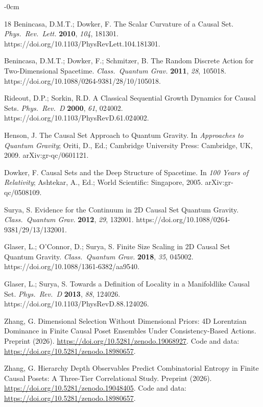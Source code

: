 \documentclass[entropy,article,submit,pdftex,moreauthors]{Definitions/mdpi}
\begin{document}
\begin{adjustwidth}{-\extralength}{0cm}
\begin{thebibliography}{18}
Benincasa, D.M.T.; Dowker, F.
The Scalar Curvature of a Causal Set.
\textit{Phys.\ Rev.\ Lett.} \textbf{2010}, \textit{104}, 181301.
https://doi.org/10.1103/PhysRevLett.104.181301.

Benincasa, D.M.T.; Dowker, F.; Schmitzer, B.
The Random Discrete Action for Two-Dimensional Spacetime.
\textit{Class.\ Quantum Grav.} \textbf{2011}, \textit{28}, 105018.
https://doi.org/10.1088/0264-9381/28/10/105018.

Rideout, D.P.; Sorkin, R.D.
A Classical Sequential Growth Dynamics for Causal Sets.
\textit{Phys.\ Rev.\ D} \textbf{2000}, \textit{61}, 024002.
https://doi.org/10.1103/PhysRevD.61.024002.

Henson, J.
The Causal Set Approach to Quantum Gravity.
In \textit{Approaches to Quantum Gravity}; Oriti, D., Ed.; Cambridge University Press: Cambridge, UK, 2009.
arXiv:gr-qc/0601121.

Dowker, F.
Causal Sets and the Deep Structure of Spacetime.
In \textit{100 Years of Relativity}; Ashtekar, A., Ed.; World Scientific: Singapore, 2005.
arXiv:gr-qc/0508109.

Surya, S.
Evidence for the Continuum in 2D Causal Set Quantum Gravity.
\textit{Class.\ Quantum Grav.} \textbf{2012}, \textit{29}, 132001.
https://doi.org/10.1088/0264-9381/29/13/132001.

Glaser, L.; O'Connor, D.; Surya, S.
Finite Size Scaling in 2D Causal Set Quantum Gravity.
\textit{Class.\ Quantum Grav.} \textbf{2018}, \textit{35}, 045002.
https://doi.org/10.1088/1361-6382/aa9540.

Glaser, L.; Surya, S.
Towards a Definition of Locality in a Manifoldlike Causal Set.
\textit{Phys.\ Rev.\ D} \textbf{2013}, \textit{88}, 124026.
https://doi.org/10.1103/PhysRevD.88.124026.

Zhang, G.
Dimensional Selection Without Dimensional Priors: 4D Lorentzian Dominance in Finite Causal Poset Ensembles Under Consistency-Based Actions.
Preprint (2026). \url{https://doi.org/10.5281/zenodo.19068927}.
Code and data: \url{https://doi.org/10.5281/zenodo.18980657}.

Zhang, G.
Hierarchy Depth Observables Predict Combinatorial Entropy in Finite Causal Posets: A Three-Tier Correlational Study.
Preprint (2026). \url{https://doi.org/10.5281/zenodo.19048405}.
Code and data: \url{https://doi.org/10.5281/zenodo.18980657}.

\end{thebibliography}

\end{adjustwidth}
\end{document}
